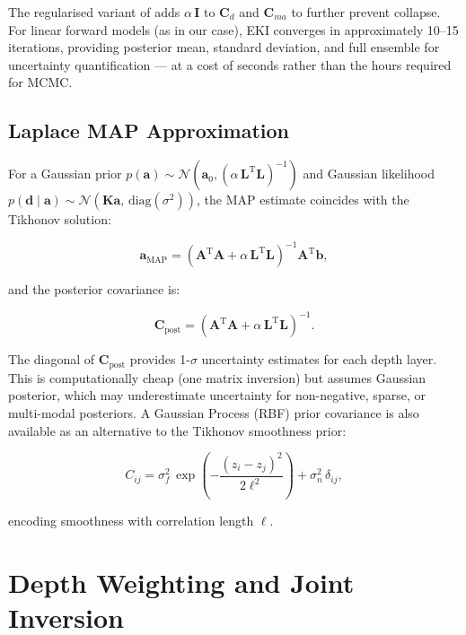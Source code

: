 \documentclass[a4paper,11pt]{article}
\begin{document}
The regularised variant of \citet{laby2025regularised} adds
$\alpha\,\bm{I}$ to $\bm{C}_d$ and $\bm{C}_{ma}$ to further prevent collapse.
For linear forward models (as in our case), EKI converges in
approximately 10--15 iterations, providing posterior mean, standard
deviation, and full ensemble for uncertainty quantification --- at a
cost of seconds rather than the hours required for MCMC.

\subsection{Laplace MAP Approximation}

For a Gaussian prior $p(\bm{a}) \sim \mathcal{N}(\bm{a}_0,
(\alpha\,\bm{L}^\mathrm{T}\bm{L})^{-1})$ and Gaussian likelihood
$p(\bm{d} \mid \bm{a}) \sim \mathcal{N}(\bm{K}\bm{a},\,\mathrm{diag}(\sigma^2))$,
the MAP estimate coincides with the Tikhonov solution:

\begin{equation}
  \bm{a}_{\mathrm{MAP}} = (\bm{A}^\mathrm{T}\bm{A} + \alpha\,\bm{L}^\mathrm{T}\bm{L})^{-1}
  \bm{A}^\mathrm{T}\bm{b},
\end{equation}

and the posterior covariance is:

\begin{equation}
  \bm{C}_{\mathrm{post}} = (\bm{A}^\mathrm{T}\bm{A} + \alpha\,\bm{L}^\mathrm{T}\bm{L})^{-1}.
\end{equation}

The diagonal of $\bm{C}_{\mathrm{post}}$ provides 1-$\sigma$ uncertainty
estimates for each depth layer.  This is computationally cheap (one
matrix inversion) but assumes Gaussian posterior, which may
underestimate uncertainty for non-negative, sparse, or multi-modal
posteriors.  A Gaussian Process (RBF) prior covariance is also available
as an alternative to the Tikhonov smoothness prior:

\begin{equation}
  C_{ij} = \sigma_f^2\,\exp\!\left(-\frac{(z_i - z_j)^2}{2\ell^2}\right) + \sigma_n^2\,\delta_{ij},
\end{equation}

encoding smoothness with correlation length $\ell$.


\section{Depth Weighting and Joint Inversion}\label{sec:geophysics}
\end{document}
